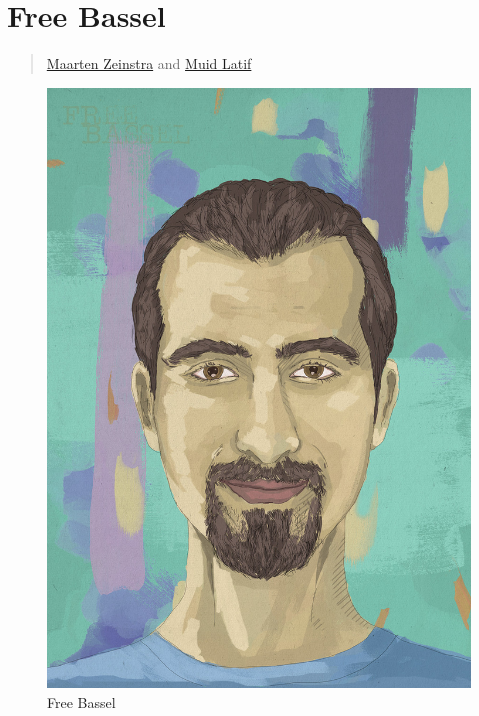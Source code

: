 \section{Free Bassel}\label{free-bassel}

\begin{quote}
\href{../appendix/attributions.html\#maarten-zeinstra}{Maarten Zeinstra}
and \href{../appendix/attributions.html\#muid-latif}{Muid Latif}
\end{quote}

\begin{figure}[htbp]
\centering
\includegraphics{../../images/ml-free-bassel-900-1.jpg}
\caption{Free Bassel}
\end{figure}
